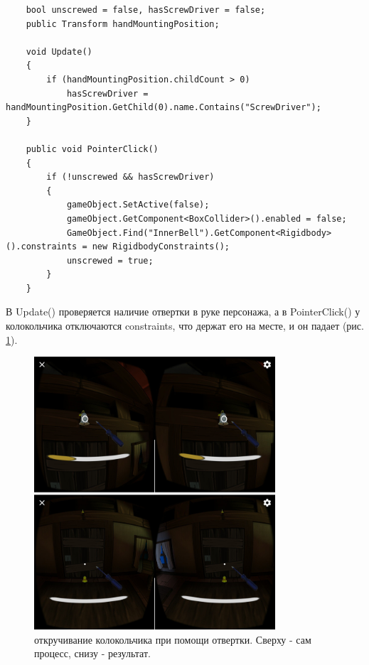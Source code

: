 \begin{small}
    \begin{verbatim}
    bool unscrewed = false, hasScrewDriver = false;
    public Transform handMountingPosition;

    void Update()
    {
        if (handMountingPosition.childCount > 0)
            hasScrewDriver = handMountingPosition.GetChild(0).name.Contains("ScrewDriver");
    }
    
    public void PointerClick()
    {
        if (!unscrewed && hasScrewDriver)
        {
            gameObject.SetActive(false);
            gameObject.GetComponent<BoxCollider>().enabled = false;
            GameObject.Find("InnerBell").GetComponent<Rigidbody>().constraints = new RigidbodyConstraints();
            unscrewed = true;
        }
    }
    \end{verbatim}
\end{small}

В Update() проверяется наличие отвертки в руке персонажа, а в PointerClick() у колокольчика отключаются constraints, что держат его на месте, и он падает (рис. \ref{full_unscrew}).


\begin{figure}[h!]
    \centering
    \includegraphics[width=0.8\textwidth]{./screenshots/full_unscrew.jpg}
    \caption{\small{откручивание колокольчика при помощи отвертки. Сверху - сам процесс, снизу - результат.}}
    \label{full_unscrew}
\end{figure} 

